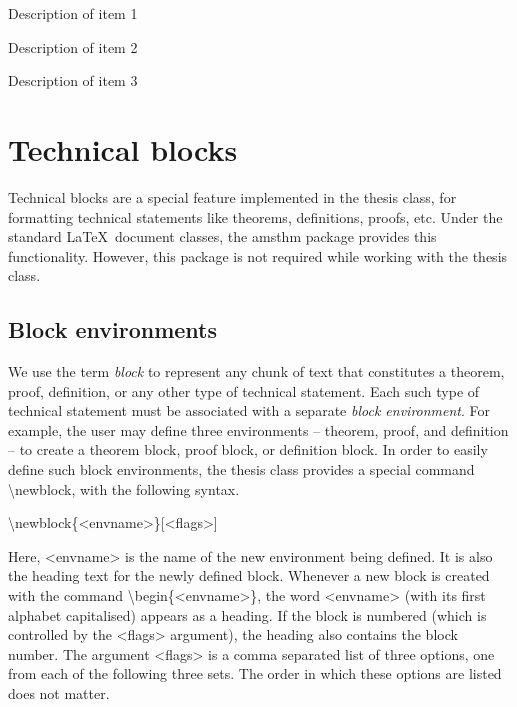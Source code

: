 \documentclass[twoside,openany]{thesis}
\begin{document}
\begin{description}[1.5cm]
\item[Item 1]   Description of item 1
\item[Item 2]   Description of item 2
\item[Item 3]   Description of item 3
\end{description}

\chapter{Technical blocks}\label{ch:Technical blocks}

Technical blocks are a special feature implemented in the {\ttfamily thesis} class, for formatting technical statements like theorems, definitions, proofs, etc.
Under the standard \LaTeX\ document classes, the {\ttfamily amsthm} package provides this functionality.
However, this package is not required while working with the {\ttfamily thesis} class.

\section{Block environments}\label{sec:Block environments}

We use the term {\itshape block} to represent any chunk of text that constitutes a theorem, proof, definition, or any other type of technical statement.
Each such type of technical statement must be associated with a separate {\itshape block environment}.
For example, the user may define three environments -- {\ttfamily theorem}, {\ttfamily proof}, and {\ttfamily definition} -- to create a theorem block, proof block, or definition block.
In order to easily define such block environments, the {\ttfamily thesis} class provides a special command {\ttfamily\textbackslash newblock}, with the following syntax.

{\ttfamily\textbackslash newblock\{<envname>\}[<flags>]}

Here, {\ttfamily<envname>} is the name of the new environment being defined.
It is also the heading text for the newly defined block.
Whenever a new block is created with the command {\ttfamily\textbackslash begin\{<envname>\}}, the word {\ttfamily<envname>} (with its first alphabet capitalised) appears as a heading.
If the block is numbered (which is controlled by the {\ttfamily<flags>} argument), the heading also contains the block number.
The argument {\ttfamily<flags>} is a comma separated list of three options, one from each of the following three sets.
The order in which these options are listed does not matter.
\end{document}
